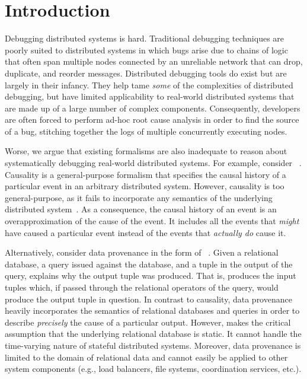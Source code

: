 \section{Introduction}
Debugging distributed systems is hard. Traditional debugging techniques are
poorly suited to distributed systems in which bugs arise due to chains of logic
that often span multiple nodes connected by an unreliable network that can
drop, duplicate, and reorder messages. Distributed debugging tools do exist but
are largely in their infancy. They help tame \emph{some} of the complexities of
distributed debugging, but have limited applicability to real-world distributed
systems that are made up of a large number of complex components. Consequently,
developers are often forced to perform ad-hoc root cause analysis in order to
find the source of a bug, stitching together the logs of multiple concurrently
executing nodes.

Worse, we argue that existing formalisms are also inadequate to reason about
systematically debugging real-world distributed systems. For example, consider
~\cite{lamport1978time}. Causality is a general-purpose
formalism that specifies the causal history of a particular event in an
arbitrary distributed system. However, causality is too general-purpose, as it
fails to incorporate any semantics of the underlying distributed
system~\cite{bailis2012potential}. As a consequence, the causal history of an
event is an overapproximation of the cause of the event. It includes all the
events that \emph{might} have caused a particular event instead of the events
that \emph{actually do} cause it.

Alternatively, consider data provenance in the form of
~\cite{cheney2009provenance, buneman2001and}. Given a
relational database, a query issued against the database, and a tuple in the
output of the query, \whyprovenance{} explains why the output tuple was
produced. That is, \whyprovenance{} produces the input tuples which, if passed
through the relational operators of the query, would produce the output tuple
in question. In contrast to causality, data provenance heavily incorporates the
semantics of relational databases and queries in order to describe
\emph{precisely} the cause of a particular output. However, \whyprovenance{}
makes the critical assumption that the underlying relational database is
static. It cannot handle the time-varying nature of stateful distributed
systems. Moreover, data provenance is limited to the domain of relational data
and cannot easily be applied to other system components (e.g., load balancers,
file systems, coordination services, etc.).

